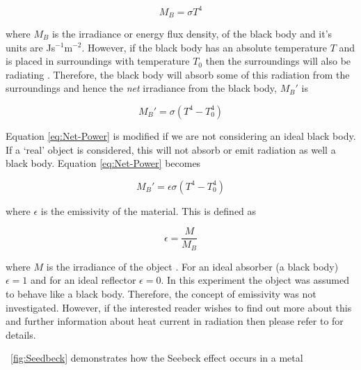 \documentclass{article}
\newcommand{\figref}[2][\figurename~]{#1\ref{#2}}
\begin{document}
\begin{equation}
\label{eq:SB-Law1}
M_B = \sigma T^4
\end{equation}

\vspace{2mm}
\noindent
where $M_B$ is the irradiance or energy flux density, of the black body \cite{Paper01} and it's units are Js$^{-1}$m$^{-2}$. However, if the black body has an absolute temperature $T$ and is placed in surroundings with temperature $T_0$ then the surroundings will also be radiating \cite{Book01}. Therefore, the black body will absorb some of this radiation from the surroundings and hence the \textit{net} irradiance from the black body, $M_B '$ is

\begin{equation}
\label{eq:Net-Power}
M_B ' = \sigma (T^4 - T_0^4)
\end{equation}

\vspace{2mm}
\noindent
Equation \eqref{eq:Net-Power} is modified if we are not considering an ideal black body. If a `real' object is considered, this will not absorb or emit radiation as well a black body. Equation \eqref{eq:Net-Power} becomes

\begin{equation}
\label{eq:Net-Power2}
M_B ' = \epsilon \sigma (T^4 - T_0^4)
\end{equation}

\vspace{2mm}
\noindent
where $\epsilon$ is the emissivity of the material. This is defined as

\begin{equation}
\label{eq:Emissivity}
\epsilon = \frac{M}{M_B}
\end{equation}

\vspace{2mm}
\noindent
where $M$ is the irradiance of the object \cite{Paper01}. For an ideal absorber (a black body) $\epsilon = 1$ and for an ideal reflector $\epsilon = 0$. In this experiment the object was  assumed to behave like a black body. Therefore, the concept of emissivity was not  investigated. However, if the interested reader wishes to find out more about this and further information about heat current in radiation then please refer to \cite{Book01} for details.

\vspace{2mm}
\noindent
\figref{fig:Seedbeck} \cite{Paper02} demonstrates how the Seebeck effect occurs in a metal
\end{document}
